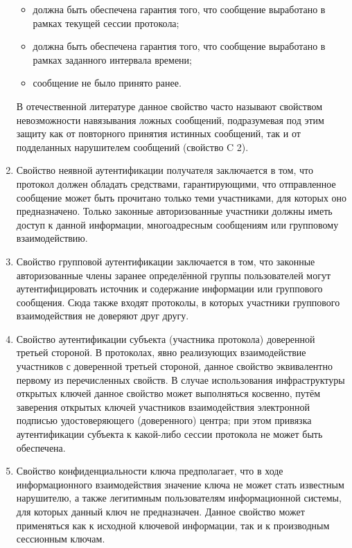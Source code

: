 \begin{enumerate}
	\begin{itemize}
		\item должна быть обеспечена гарантия того, что сообщение выработано в рамках текущей сессии протокола;
		\item должна быть обеспечена гарантия того, что сообщение выработано в рамках заданного интервала времени;
		\item сообщение не было принято ранее.
	\end{itemize}
	
	В отечественной литературе данное свойство часто называют свойством невозможности навязывания ложных сообщений, подразумевая под этим защиту как от повторного принятия истинных сообщений, так и от подделанных нарушителем сообщений (свойство C 2).
	
	\item Свойство неявной аутентификации получателя заключается в том, что протокол должен обладать средствами, гарантирующими, что отправленное сообщение может быть прочитано только теми участниками, для которых оно предназначено. Только законные авторизованные участники должны иметь доступ к данной информации, многоадресным сообщениям или групповому взаимодействию.
	
	\item Свойство групповой аутентификации заключается в том, что законные авторизованные члены заранее определённой группы пользователей могут аутентифицировать источник и содержание информации или группового сообщения. Сюда также входят протоколы, в которых участники группового взаимодействия не доверяют друг другу.
	
	\item Свойство аутентификации субъекта (участника протокола) доверенной третьей стороной. В протоколах, явно реализующих взаимодействие участников с доверенной третьей стороной, данное свойство эквивалентно первому из перечисленных свойств. В случае использования инфраструктуры открытых ключей данное свойство может выполняться косвенно, путём заверения открытых ключей участников взаимодействия электронной подписью удостоверяющего (доверенного) центра; при этом привязка аутентификации субъекта к какой-либо сессии протокола не может быть обеспечена.
	
	\item Свойство конфиденциальности ключа предполагает, что в ходе информационного взаимодействия значение ключа не может стать известным нарушителю, а также легитимным пользователям информационной системы, для которых данный ключ не предназначен. Данное свойство может применяться как к исходной ключевой информации, так и к производным сессионным ключам.
	

\end{enumerate}
